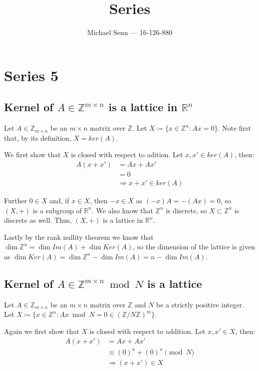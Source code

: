 \documentclass[a4paper]{scrreprt}
\title{Series \series}
\author{Michael Senn \maillink{michael.senn@students.unibe.ch} --- 16-126-880}
\date{\printdate}
\newcommand{\series}{5}
\begin{document}
\maketitle


\setcounter{chapter}{\numexpr \series - 1 \relax}

\chapter{Series \series}

\section{Kernel of $A \in \mathbb{Z}^{m \times n}$ is a lattice in $\mathbb{R}^n$}

Let $A \in \mathbb{Z}_{m \times n}$ be an $m \times n$ matrix over
$\mathbb{Z}$. Let $X \coloneqq \{x \in \mathbb{Z}^n : Ax = 0\}$. Note first
that, by its definition, $X = ker(A)$.

We first show that $X$ is closed with respect to adition. Let $x, x' \in
ker(A)$, then:
\begin{align*}
		A(x + x') & = Ax + Ax' \\
				  & = 0 \\
				  & \Rightarrow x + x' \in ker(A)
\end{align*}

Further $0 \in X$ and, if $x \in X$, then $-x \in X$ as $(-x)A = -(Ax) = 0$, so
$(X, +)$ is a subgroup of $\mathbb{R}^n$. We also know that $\mathbb{Z}^n$ is
discrete, so $X \subset \mathbb{Z}^n$ is discrete as well. Thus, $(X, +)$ is a
lattice in $\mathbb{R}^n$.

Lastly by the rank nullity theorem we know that $\dim \mathbb{Z}^n = \dim Im(A)
+ \dim Ker(A)$, so the dimension of the lattice is given as $\dim Ker(A) = \dim
\mathbb{Z}^n - \dim Im(A) = n - \dim Im(A)$.

\section{Kernel of $A \in \mathbb{Z}^{m \times n} \bmod N$ is a lattice}

Let $A \in \mathbb{Z}_{m \times n}$ be an $m \times n$ matrix over $\mathbb{Z}$
and $N$ be a strictly positive integer. Let $X \coloneqq \{x \in \mathbb{Z}^n :
Ax \bmod N = 0 \in (\mathbb{Z}/N\mathbb{Z})^m \}$.

Again we first show that $X$ is closed with respect to addition. Let $x, x' \in
X$, then:
\begin{align*}
		A(x + x') & = Ax + Ax' \\
				  & \equiv (0)^n + (0)^n \pmod{N} \\
				  & \Rightarrow (x + x') \in X
\end{align*}
\end{document}
